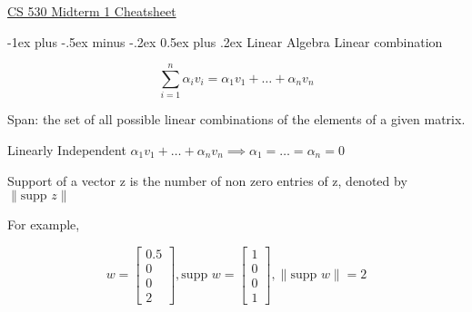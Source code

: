 \documentclass[10pt,landscape]{article}
\makeatletter
\renewcommand{\section}{\@startsection{section}{1}{0mm}%
                                {-1ex plus -.5ex minus -.2ex}%
                                {0.5ex plus .2ex}%
                                {\normalfont\large\bfseries}}
\makeatother
\begin{document}
	\newcommand{\conj}[1] {\overline{#1}}
	\newcommand{\cmod}[1] {|#1|}
	\newcommand{\norm}[1] {\|#1\|}
	\newcommand{\Complex}[0] {\mathbb{C}}
	\newcommand{\fte}[3] {e^{2 \pi i \frac{#1*#2}{#3}}}
	\newcommand{\ftem}[3] {e^{2 \pi i \frac{#1 #2}{#3}}}
	\newcommand{\fteim}[3] {e^{-2 \pi i \frac{#1 #2}{#3}}}
	\newcommand{\fteb}[2] {e^{2 \pi i \frac{#1}{#2}}}
	\newcommand{\ftei}[2] {e^{i \frac{#1 \pi}{#2}}}
	\newcommand{\ftein}[2] {e^{-i \frac{#1 \pi}{#2}}}
	\newcommand{\imagewidth}[0]{0.9\textwidth}
	\newcommand{\inp}[2]{\langle #1, #2 \rangle}
	\newcommand{\union}[0]{\cup}
\raggedright
\footnotesize
\begin{multicols}{3}


\setlength{\premulticols}{1pt}
\setlength{\postmulticols}{1pt}
\setlength{\multicolsep}{1pt}
\setlength{\columnsep}{2pt}

\begin{center}
     \Large{\underline{CS 530 Midterm 1 Cheatsheet}} \\
\end{center}

\section{Linear Algebra}
Linear combination

$$
\sum_{i=1}^{n} \alpha_iv_i = \alpha_1v_1 + \dots + \alpha_nv_n
$$

Span: the set of all possible linear combinations of the elements of a given matrix.

Linearly Independent 
$\alpha_1v_1 + \dots + \alpha_nv_n \implies \alpha_1 = \dots = \alpha_n = 0$

Support of a vector z is the number of non zero entries of z, denoted by $\norm{\text{supp } z}$

For example,

$$
w = 
\begin{bmatrix}
0.5 \\
0 \\
0 \\
2
\end{bmatrix}
,
\text{supp } w
=
\begin{bmatrix}
1 \\
0 \\
0 \\
1
\end{bmatrix}
,
\norm{\text{supp } w} = 2
$$


\end{multicols}
\end{document}
